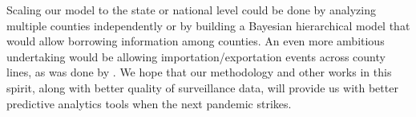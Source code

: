 Scaling our model to the state or national level could be done by analyzing multiple counties independently or by building a Bayesian hierarchical model that would allow borrowing information among counties.
An even more ambitious undertaking would be allowing importation/exportation events across county lines, as was done by \citet{pei2021burden}. We hope that our methodology and other works in this spirit, along with better quality of surveillance data, will provide us with better predictive analytics tools when the next pandemic strikes.
